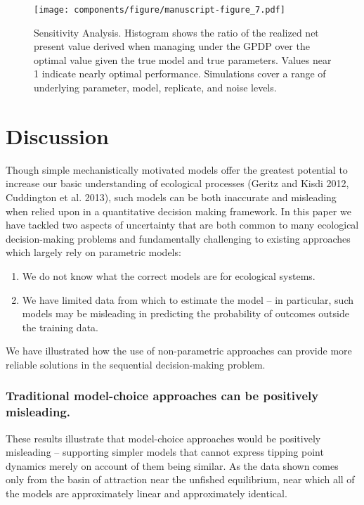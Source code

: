 \documentclass[author-year, 12pt,review]{elsarticle} %
\makeatletter
\def\maxwidth{\ifdim\Gin@nat@width>\linewidth\linewidth
\else\Gin@nat@width\fi}
\let\Oldincludegraphics\includegraphics
\renewcommand{\includegraphics}[1]{\Oldincludegraphics[width=\maxwidth]{#1}}
\makeatother
\begin{document}
\begin{figure}[htbp]
\centering
\texttt{[image: components/figure/manuscript-figure\_7.pdf]}
\caption{Sensitivity Analysis. Histogram shows the ratio of the realized
net present value derived when managing under the GPDP over the optimal
value given the true model and true parameters. Values near 1 indicate
nearly optimal performance. Simulations cover a range of underlying
parameter, model, replicate, and noise levels.}
\end{figure}

\section{Discussion}\label{discussion}

Though simple mechanistically motivated models offer the greatest
potential to increase our basic understanding of ecological processes
(Geritz and Kisdi 2012, Cuddington et al. 2013), such models can be both
inaccurate and misleading when relied upon in a quantitative decision
making framework. In this paper we have tackled two aspects of
uncertainty that are both common to many ecological decision-making
problems and fundamentally challenging to existing approaches which
largely rely on parametric models:

\begin{enumerate}
\def\labelenumi{\arabic{enumi}.}
\itemsep1pt\parskip0pt
\item
  We do not know what the correct models are for ecological systems.
\item
  We have limited data from which to estimate the model -- in
  particular, such models may be misleading in predicting the
  probability of outcomes outside the training data.
\end{enumerate}

We have illustrated how the use of non-parametric approaches can provide
more reliable solutions in the sequential decision-making problem.

\subsubsection{Traditional model-choice approaches can be positively
misleading.}\label{traditional-model-choice-approaches-can-be-positively-misleading.}

These results illustrate that model-choice approaches would be
positively misleading -- supporting simpler models that cannot express
tipping point dynamics merely on account of them being similar. As the
data shown comes only from the basin of attraction near the unfished
equilibrium, near which all of the models are approximately linear and
approximately identical.
\end{document}
